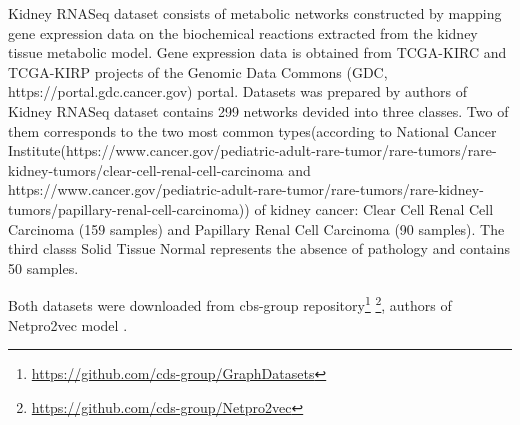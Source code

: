Kidney RNASeq dataset consists of metabolic networks constructed by mapping gene expression data on the biochemical reactions 
extracted from the kidney tissue metabolic model. Gene expression data is obtained from TCGA-KIRC and TCGA-KIRP projects
of the Genomic Data Commons (GDC, https://portal.gdc.cancer.gov) portal. Datasets was prepared by authors of \cite{Netpro2vec}
Kidney RNASeq dataset contains 299 networks devided into three classes. Two of them corresponds to the two most common types(according to National Cancer Institute(https://www.cancer.gov/pediatric-adult-rare-tumor/rare-tumors/rare-kidney-tumors/clear-cell-renal-cell-carcinoma and https://www.cancer.gov/pediatric-adult-rare-tumor/rare-tumors/rare-kidney-tumors/papillary-renal-cell-carcinoma))
of kidney cancer: Clear Cell Renal Cell Carcinoma (159 samples) and Papillary Renal Cell Carcinoma (90 samples). The third classs Solid Tissue Normal represents the absence of pathology 
and contains 50 samples.

Both datasets were downloaded from cbs-group repository\footnote{\url{https://github.com/cds-group/GraphDatasets}} \footnote{\url{https://github.com/cds-group/Netpro2vec}}, authors of Netpro2vec model \cite{Netpro2vec}.
